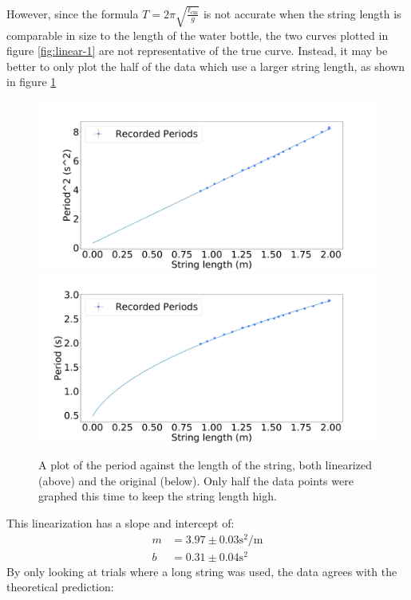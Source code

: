 \documentclass[%
 reprint,
 amsmath,amssymb
 aps,
]{revtex4-2}
\begin{document}
However, since the formula $T = 2\pi\sqrt{\frac{\ell_\text{cm}}{g}}$ is not accurate when the string length is comparable in size to the length of the water bottle, the two curves plotted in figure \ref{fig:linear-1} are not representative of the true curve. Instead, it may be better to only plot the half of the data which use a larger string length, as shown in figure \ref{fig:plot-2}
\begin{figure}[!h]
    \includegraphics[width=\linewidth]{Figures/linear_2.png}
    \includegraphics[width=\linewidth]{Figures/normal_2.png}

    \caption{A plot of the period against the length of the string, both linearized (above) and the original (below). Only half the data points were graphed this time to keep the string length high.}
    \label{fig:plot-2}
\end{figure}
This linearization has a slope and intercept of:
\begin{align}
    m &= 3.97 \pm 0.03 \si{\second\squared\per\meter} \\ 
    b &= 0.31 \pm 0.04 \si{\second\squared}
    \label{eq:}
\end{align}
By only looking at trials where a long string was used, the data agrees with the theoretical prediction:
\end{document}
